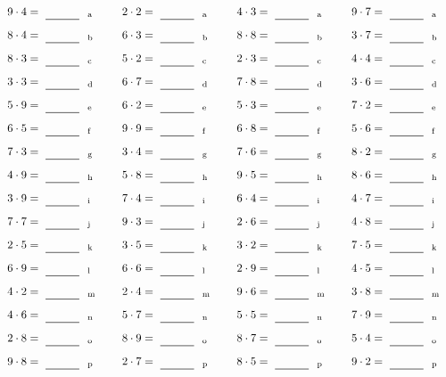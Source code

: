 \documentclass
[
  draft    = true,
  fontsize = 11pt,
  parskip  = half-
]
{scrartcl}
\begin{document}
\par\vfill\par
\begin{align*}
    \pline{9\cdot4}&=\rline{a}
  & \pline{2\cdot2}&=\rline{a}
  & \pline{4\cdot3}&=\rline{a}
  & \pline{9\cdot7}&=\rline{a} \\[1ex]
    \pline{8\cdot4}&=\rline{b}
  & \pline{6\cdot3}&=\rline{b}
  & \pline{8\cdot8}&=\rline{b}
  & \pline{3\cdot7}&=\rline{b} \\[1ex]
    \pline{8\cdot3}&=\rline{c}
  & \pline{5\cdot2}&=\rline{c}
  & \pline{2\cdot3}&=\rline{c}
  & \pline{4\cdot4}&=\rline{c} \\[1ex]
    \pline{3\cdot3}&=\rline{d}
  & \pline{6\cdot7}&=\rline{d}
  & \pline{7\cdot8}&=\rline{d}
  & \pline{3\cdot6}&=\rline{d} \\[1ex]
    \pline{5\cdot9}&=\rline{e}
  & \pline{6\cdot2}&=\rline{e}
  & \pline{5\cdot3}&=\rline{e}
  & \pline{7\cdot2}&=\rline{e} \\[1ex]
    \pline{6\cdot5}&=\rline{f}
  & \pline{9\cdot9}&=\rline{f}
  & \pline{6\cdot8}&=\rline{f}
  & \pline{5\cdot6}&=\rline{f} \\[1ex]
    \pline{7\cdot3}&=\rline{g}
  & \pline{3\cdot4}&=\rline{g}
  & \pline{7\cdot6}&=\rline{g}
  & \pline{8\cdot2}&=\rline{g} \\[1ex]
    \pline{4\cdot9}&=\rline{h}
  & \pline{5\cdot8}&=\rline{h}
  & \pline{9\cdot5}&=\rline{h}
  & \pline{8\cdot6}&=\rline{h} \\[1ex]
    \pline{3\cdot9}&=\rline{i}
  & \pline{7\cdot4}&=\rline{i}
  & \pline{6\cdot4}&=\rline{i}
  & \pline{4\cdot7}&=\rline{i} \\[1ex]
    \pline{7\cdot7}&=\rline{j}
  & \pline{9\cdot3}&=\rline{j}
  & \pline{2\cdot6}&=\rline{j}
  & \pline{4\cdot8}&=\rline{j} \\[1ex]
    \pline{2\cdot5}&=\rline{k}
  & \pline{3\cdot5}&=\rline{k}
  & \pline{3\cdot2}&=\rline{k}
  & \pline{7\cdot5}&=\rline{k} \\[1ex]
    \pline{6\cdot9}&=\rline{l}
  & \pline{6\cdot6}&=\rline{l}
  & \pline{2\cdot9}&=\rline{l}
  & \pline{4\cdot5}&=\rline{l} \\[1ex]
    \pline{4\cdot2}&=\rline{m}
  & \pline{2\cdot4}&=\rline{m}
  & \pline{9\cdot6}&=\rline{m}
  & \pline{3\cdot8}&=\rline{m} \\[1ex]
    \pline{4\cdot6}&=\rline{n}
  & \pline{5\cdot7}&=\rline{n}
  & \pline{5\cdot5}&=\rline{n}
  & \pline{7\cdot9}&=\rline{n} \\[1ex]
    \pline{2\cdot8}&=\rline{o}
  & \pline{8\cdot9}&=\rline{o}
  & \pline{8\cdot7}&=\rline{o}
  & \pline{5\cdot4}&=\rline{o} \\[1ex]
    \pline{9\cdot8}&=\rline{p}
  & \pline{2\cdot7}&=\rline{p}
  & \pline{8\cdot5}&=\rline{p}
  & \pline{9\cdot2}&=\rline{p}
\end{align*}
\end{document}
